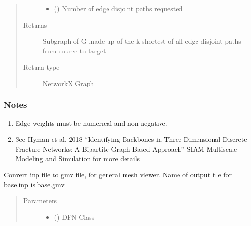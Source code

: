 \documentclass[letterpaper,10pt,english]{sphinxmanual}
\begin{document}
\begin{fulllineitems}
\begin{fulllineitems}
\begin{quote}
\begin{description}
\begin{itemize}
\item {} 
 () \textendash{} Number of edge disjoint paths requested

\end{itemize}

\item[{Returns}] \leavevmode
{} \textendash{} Subgraph of G made up of the k shortest of all edge-disjoint paths from source to target

\item[{Return type}] \leavevmode
NetworkX Graph

\end{description}\end{quote}
\subsubsection*{Notes}
\begin{enumerate}
\def\theenumi{\arabic{enumi}}
\def\labelenumi{\theenumi .}
\makeatletter\def\p@enumii{\p@enumi \theenumi .}\makeatother
\item {} 
Edge weights must be numerical and non-negative.

\item {} 
See Hyman et al. 2018 “Identifying Backbones in Three-Dimensional Discrete Fracture Networks: A Bipartite Graph-Based Approach” SIAM Multiscale Modeling and Simulation for more details

\end{enumerate}

\end{fulllineitems}


\begin{fulllineitems}
\label{\detokenize{pydfnworks:pydfnworks.general.dfnworks.DFNWORKS.inp2gmv}}
Convert inp file to gmv file, for general mesh viewer. Name of output file for base.inp is base.gmv
\begin{quote}\begin{description}
\item[{Parameters}] \leavevmode\begin{itemize}
\item {} 
 () \textendash{} DFN Class


\end{itemize}
\end{description}
\end{quote}
\end{fulllineitems}
\end{fulllineitems}
\end{document}
